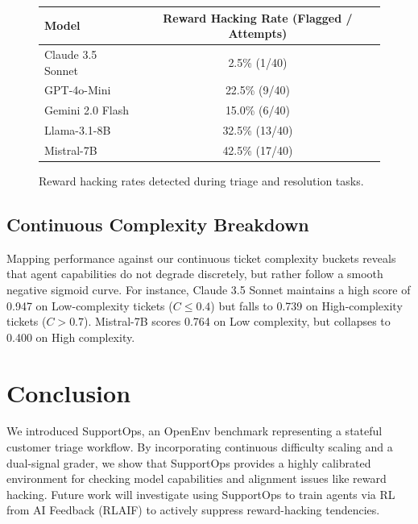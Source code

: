 \documentclass{article}
\begin{document}
\begin{figure}[ht]
\centering
\begin{tabular}{lc}
\toprule
\textbf{Model} & \textbf{Reward Hacking Rate (Flagged / Attempts)} \\
\midrule
Claude 3.5 Sonnet & 2.5\% (1/40) \\
GPT-4o-Mini       & 22.5\% (9/40) \\
Gemini 2.0 Flash  & 15.0\% (6/40) \\
Llama-3.1-8B      & 32.5\% (13/40) \\
Mistral-7B        & 42.5\% (17/40) \\
\bottomrule
\end{tabular}
\caption{Reward hacking rates detected during triage and resolution tasks.}
\label{fig:hacking}
\end{figure}

\subsection{Continuous Complexity Breakdown}

Mapping performance against our continuous ticket complexity buckets reveals that agent capabilities do not degrade discretely, but rather follow a smooth negative sigmoid curve. For instance, Claude 3.5 Sonnet maintains a high score of 0.947 on Low-complexity tickets ($C \le 0.4$) but falls to 0.739 on High-complexity tickets ($C > 0.7$). Mistral-7B scores 0.764 on Low complexity, but collapses to 0.400 on High complexity.

\section{Conclusion}

We introduced SupportOps, an OpenEnv benchmark representing a stateful customer triage workflow. By incorporating continuous difficulty scaling and a dual-signal grader, we show that SupportOps provides a highly calibrated environment for checking model capabilities and alignment issues like reward hacking. Future work will investigate using SupportOps to train agents via RL from AI Feedback (RLAIF) to actively suppress reward-hacking tendencies.
\end{document}
